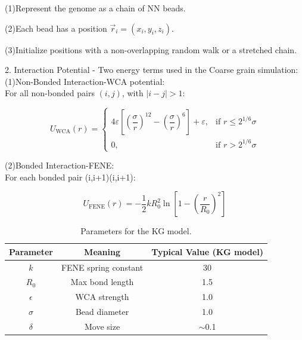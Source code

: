\documentclass[12pt]{article}
\begin{document}
\begin{flushleft}
\setlength{\parindent}{6em} (1)Represent the genome as a chain of NN beads.

(2)Each bead has a position $\vec{r}_i = (x_i, y_i, z_i)$.

(3)Initialize positions with a non-overlapping random walk or a stretched chain.\\

\setlength{\parindent}{0pt}




2. Interaction Potential - Two energy terms used in the Coarse grain simulation:\\

\setlength{\parindent}{6em}(1)Non-Bonded Interaction-WCA potential:\\
\setlength{\parindent}{0pt}
\setlength{\parindent}{7em}For all non-bonded pairs $(i, j)$, with $|i - j| > 1$:
\setlength{\parindent}{0pt}

\begin{equation}
U_{\text{WCA}}(r) = 
\begin{cases}
4\varepsilon \left[ \left( \dfrac{\sigma}{r} \right)^{12} - \left( \dfrac{\sigma}{r} \right)^6 \right] + \varepsilon, & \text{if } r \leq 2^{1/6} \sigma \\
0, & \text{if } r > 2^{1/6} \sigma
\end{cases}
\end{equation}


\setlength{\parindent}{6em}(2)Bonded Interaction-FENE:\\
\setlength{\parindent}{0pt}
\setlength{\parindent}{8em}For each bonded pair (i,i+1)(i,i+1):

\begin{equation}
U_{\text{FENE}}(r) = -\frac{1}{2} k R_0^2 \ln \left[ 1 - \left( \frac{r}{R_0} \right)^2 \right]
\end{equation}

\setlength{\parindent}{30pt}

\begin{table}[h]
\centering
\begin{tabular}{|c|c|c|}
\hline
\textbf{Parameter} & \textbf{Meaning} & \textbf{Typical Value (KG model)} \\ \hline
$k$ & FENE spring constant & 30 \\ \hline
$R_0$ & Max bond length & 1.5 \\ \hline
$\epsilon$ & WCA strength & 1.0 \\ \hline
$\sigma$ & Bead diameter & 1.0 \\ \hline
$\delta$ & Move size & $\sim$0.1 \\ \hline
\end{tabular}
\caption{Parameters for the KG model.}
\label{tab:kg_parameters}
\end{table}




\end{flushleft}
\end{document}
